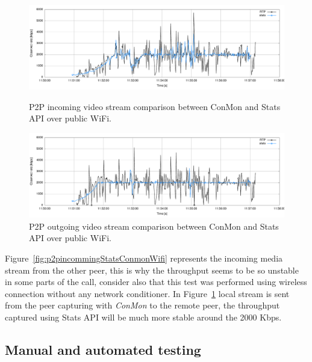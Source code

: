 \begin{figure}[h]
	\begin{minipage}{.5\textwidth}
		\includegraphics[width=1\textwidth]{./figures/p2pincommingStatsConmonWifi.pdf}
			\caption[P2P incoming video stream comparison between ConMon and Stats API over public WiFi]{P2P incoming video stream comparison between ConMon and Stats API over public WiFi.}
			\label{fig:p2pincommingStatsConmonWifi}
	 \end{minipage}
	 \begin{minipage}{.5\textwidth}
		\includegraphics[width=1\textwidth]{./figures/p2poutgoingStatsConmonWifi.pdf}
			\caption[P2P outgoing video stream comparison between ConMon and Stats API over public WiFi]{P2P outgoing video stream comparison between ConMon and Stats API over public WiFi.}
			\label{fig:p2poutgoingStatsConmonWifi}
	 \end{minipage}
\end{figure}

Figure~\ref{fig:p2pincommingStatsConmonWifi} represents the incoming media stream from the other peer, this is why the throughput seems to be so unstable in some parts of the call, consider also that this test was performed using wireless connection without any network conditioner. In Figure~\ref{fig:p2poutgoingStatsConmonWifi} local stream is sent from the peer capturing with {\it ConMon} to the remote peer, the throughput captured using Stats API will be much more stable around the 2000 Kbps.

\subsection{Manual and automated testing}

